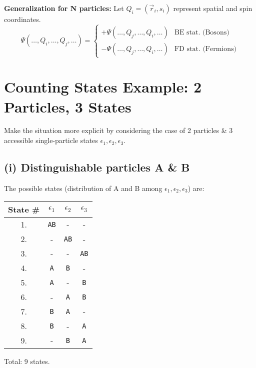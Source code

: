 \documentclass[11pt]{article}
\newcommand{\eps}{\epsilon}
\begin{document}
\textbf{Generalization for N particles:}
Let $Q_i = (\vec{r}_i, s_i)$ represent spatial and spin coordinates.
\[ \Psi(\dots, Q_i, \dots, Q_j, \dots) = \begin{cases} +\Psi(\dots, Q_j, \dots, Q_i, \dots) & \text{BE stat. (Bosons)} \\ -\Psi(\dots, Q_j, \dots, Q_i, \dots) & \text{FD stat. (Fermions)} \end{cases} \]

\section*{Counting States Example: 2 Particles, 3 States}

Make the situation more explicit by considering the case of 2 particles \& 3 accessible single-particle states $\eps_1, \eps_2, \eps_3$.

\subsection*{(i) Distinguishable particles A \& B}
The possible states (distribution of A and B among $\eps_1, \eps_2, \eps_3$) are:
\begin{center}
\begin{tabular}{cccc}
\toprule
State \# & $\eps_1$ & $\eps_2$ & $\eps_3$ \\
\midrule
1. & \texttt{AB} & - & - \\
2. & - & \texttt{AB} & - \\
3. & - & - & \texttt{AB} \\
4. & \texttt{A} & \texttt{B} & - \\
5. & \texttt{A} & - & \texttt{B} \\
6. & - & \texttt{A} & \texttt{B} \\
7. & \texttt{B} & \texttt{A} & - \\
8. & \texttt{B} & - & \texttt{A} \\
9. & - & \texttt{B} & \texttt{A} \\
\bottomrule
\end{tabular}
\end{center}
Total: 9 states.
\end{document}
